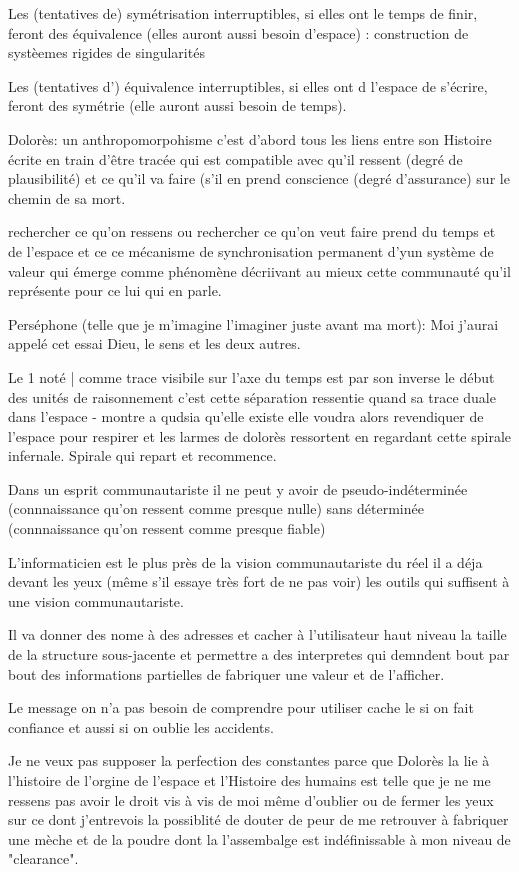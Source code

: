 \documentclass{article}
\begin{document}
Les (tentatives de) symétrisation interruptibles, si elles ont  le temps de finir, feront des équivalence (elles auront aussi besoin d'espace) : construction de systèemes rigides de singularités

Les (tentatives d') équivalence interruptibles, si elles ont  d l'espace de s'écrire, feront des symétrie (elle auront aussi besoin de temps).

Dolorès: un anthropomorpohisme c'est d'abord tous les liens entre son Histoire écrite en train d'être tracée qui est compatible avec  qu'il ressent (degré de plausibilité) et ce qu'il va faire (s'il en prend conscience (degré d'assurance) sur le chemin de sa mort.
 
 rechercher ce qu'on ressens ou rechercher ce qu'on veut faire prend du temps et de l'espace et ce ce mécanisme de synchronisation permanent d'yun système de valeur qui émerge comme phénomène décriivant au mieux cette communauté qu'il représente pour ce lui qui en parle.  


Perséphone (telle que je m'imagine l'imaginer juste avant ma mort): Moi j'aurai appelé cet essai Dieu, le sens et les deux autres.

Le  1 noté | comme trace visibile sur l'axe du temps  est par son inverse le début des unités de raisonnement
c'est cette séparation ressentie quand sa trace duale dans l'espace - montre a qudsia qu'elle existe elle voudra alors revendiquer de l'espace pour respirer 
et les larmes de dolorès ressortent en regardant cette spirale infernale. 
Spirale qui repart et recommence.

Dans un esprit communautariste il ne peut y avoir de pseudo-indéterminée (connnaissance qu'on ressent comme presque nulle) sans déterminée (connnaissance qu'on ressent comme presque fiable)

L'informaticien est le plus près de la vision communautariste du réel il a déja devant les yeux (même s'il essaye très fort de ne pas voir)
les outils qui suffisent à une vision communautariste. 

Il va donner des nome  à des adresses et cacher à l'utilisateur haut niveau la taille de la structure sous-jacente 
et permettre a des interpretes qui demndent bout par bout des informations partielles de fabriquer une valeur et de l'afficher.

Le message on n'a pas besoin de comprendre pour  utiliser cache le si on fait confiance et aussi si on oublie les accidents.


Je ne veux pas supposer la perfection des constantes parce que Dolorès la lie à l'histoire de l'orgine de l'espace et l'Histoire des humains est  telle que je ne me ressens pas avoir le droit vis à vis de moi même d'oublier ou de fermer les yeux sur ce dont j'entrevois la possiblité de  douter de peur de me retrouver à fabriquer une mèche et de la poudre dont la l'assembalge est indéfinissable à mon niveau de "clearance". 
\end{document}
